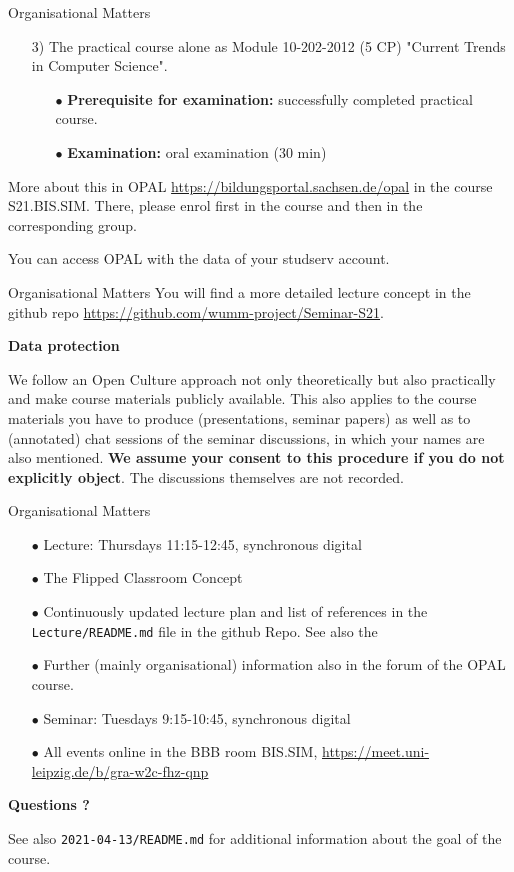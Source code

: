 \documentclass{beamer}
\newcommand{\ueberschrift}[1]{\begin{center}\bf #1\end{center}}
\begin{document}
\begin{frame}{Organisational Matters}
\begin{itemize}
\item[3)] The practical course alone as Module 10-202-2012 (5 CP) "Current
  Trends in Computer Science".
  \begin{itemize}[noitemsep]
  \item[$\bullet$] \textbf{Prerequisite for examination:} successfully
    completed practical course.
  \item[$\bullet$] \textbf{Examination:} oral examination (30 min)
  \end{itemize}
\end{itemize}
More about this in OPAL \url{https://bildungsportal.sachsen.de/opal} in the
course S21.BIS.SIM.  There, please enrol first in the course and then in the
corresponding group.

You can access OPAL with the data of your studserv account.

\end{frame}

\begin{frame}{Organisational Matters}
You will find a more detailed lecture concept in the github repo
\url{https://github.com/wumm-project/Seminar-S21}.

\ueberschrift{Data protection}

We follow an Open Culture approach not only theoretically but also practically
and make course materials publicly available. This also applies to the course
materials you have to produce (presentations, seminar papers) as well as to
(annotated) chat sessions of the seminar discussions, in which your names are
also mentioned. \textbf{We assume your consent to this procedure if you do not
  explicitly object}. The discussions themselves are not recorded.

\end{frame}

\begin{frame}{Organisational Matters}

\begin{itemize}
\item[$\bullet$] Lecture: Thursdays 11:15-12:45, synchronous digital
\item[$\bullet$] The Flipped Classroom Concept
\item[$\bullet$] Continuously updated lecture plan and list of references in
  the \texttt{Lecture/README.md} file in the github Repo.  See also the
\item[$\bullet$] Further (mainly organisational) information also in the forum
  of the OPAL course.
\item[$\bullet$] Seminar: Tuesdays 9:15-10:45, synchronous digital
\item[$\bullet$] All events online in the BBB room BIS.SIM,
  \url{https://meet.uni-leipzig.de/b/gra-w2c-fhz-qnp}
\end{itemize}
\begin{center}\LARGE\bf
  Questions ?
\end{center}

See also \texttt{2021-04-13/README.md} for additional information about the
goal of the course. 

\end{frame}
\end{document}

